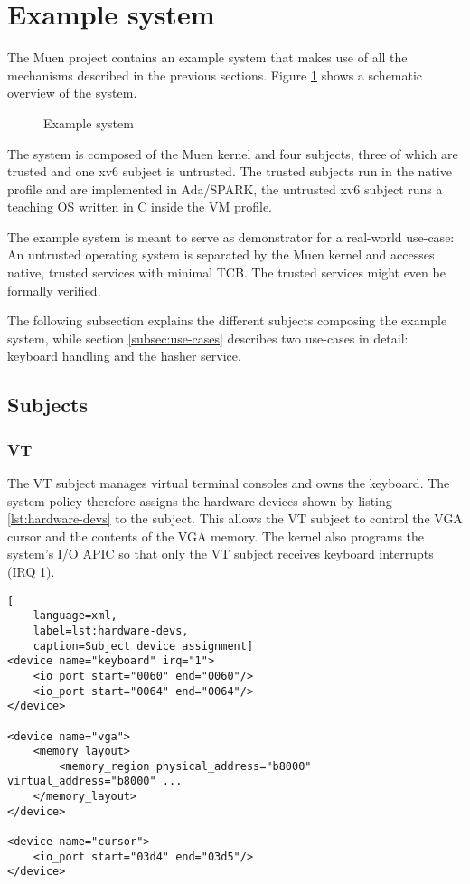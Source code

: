 \section{Example system}\label{sec:example-system}
The Muen project contains an example system that makes use of all the
mechanisms described in the previous sections. Figure \ref{fig:example-system}
shows a schematic overview of the system.

\begin{figure}[h]
	\centering
	
	\caption{Example system}
	\label{fig:example-system}
\end{figure}

The system is composed of the Muen kernel and four subjects, three of which are
trusted and one xv6 subject is untrusted. The trusted subjects run in the native
profile and are implemented in Ada/SPARK, the untrusted xv6 subject runs a teaching
OS written in C inside the VM profile.

The example system is meant to serve as demonstrator for a real-world use-case:
An untrusted operating system is separated by the Muen kernel and accesses
native, trusted services with minimal TCB. The trusted services might even be
formally verified.

The following subsection explains the different subjects composing the example
system, while section \ref{subsec:use-cases} describes two use-cases in detail:
keyboard handling and the hasher service.

\subsection{Subjects}

\subsubsection{VT}
The VT subject manages virtual terminal consoles and owns the keyboard. The
system policy therefore assigns the hardware devices shown by listing
\ref{lst:hardware-devs} to the subject. This allows the VT subject to control
the VGA cursor and the contents of the VGA memory. The kernel also programs the
system's I/O APIC so that only the VT subject receives keyboard interrupts (IRQ
1).

\begin{lstlisting}[
	language=xml,
	label=lst:hardware-devs,
	caption=Subject device assignment]
<device name="keyboard" irq="1">
    <io_port start="0060" end="0060"/>
    <io_port start="0064" end="0064"/>
</device>

<device name="vga">
    <memory_layout>
        <memory_region physical_address="b8000" virtual_address="b8000" ...
    </memory_layout>
</device>

<device name="cursor">
    <io_port start="03d4" end="03d5"/>
</device>
\end{lstlisting}


